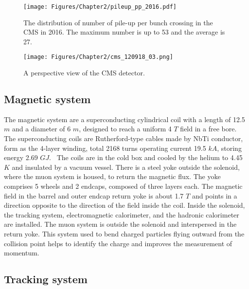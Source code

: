 \begin{figure}[t]
  \centering
  \texttt{[image: Figures/Chapter2/pileup\_pp\_2016.pdf]}
  \caption{The distribution of number of pile-up per bunch crossing in the CMS in 2016. The maximum number is up to 53 and the average is 27.}
  \label{fig:CMS_PU}
\end{figure}

\begin{figure}[t]
  \centering
  \texttt{[image: Figures/Chapter2/cms\_120918\_03.png]}
  \caption{A perspective view of the CMS detector.}
  \label{fig:CMS}
\end{figure}

\subsection{Magnetic system}

The magnetic system are a superconducting cylindrical coil with a length of 12.5 $m$ and a diameter of 6 $m$, designed to reach a uniform 4 $T$ field in a free bore.
The superconducting coils are Rutherford-type cables made by NbTi conductor, form as the 4-layer winding, total 2168 turns operating current 19.5 $kA$, storing energy 2.69 $GJ$.~\cite{CMS:MagPrjt}
The coils are in the cold box and cooled by the helium to 4.45 $K$ and insulated by a vacuum vessel.
There is a steel yoke outside the solenoid, where the muon system is housed, to return the magnetic flux. The yoke comprises 5 wheels and 2 endcaps, composed of three layers each. 
The magnetic field in the barrel and outer endcap return yoke is about 1.7 $T$ and points in a direction opposite to the direction of the field inside the coil.
Inside the solenoid, the tracking system, electromagnetic calorimeter, and the hadronic calorimeter are installed.
The muon system is outside the solenoid and interspersed in the return yoke.
This system used to bend charged particles flying outward from the collision point helps to identify the charge and improves the measurement of momentum.

\subsection{Tracking system} 

